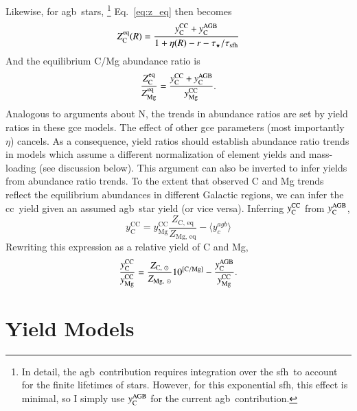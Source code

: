 \documentclass[12pt,oneside,letterpaper]{report}
\newcommand{\cc}{\gls{cc}}
\newcommand{\agb}{\gls{agb}}
\newcommand{\sfh}{\gls{sfh}}
\newcommand{\gce}{\gls{gce}}
\newcommand{\Ycc}{\ensuremath{y_{\rm C}^{\rm CC}}}
\newcommand{\Yoc}{\ensuremath{y_{\rm Mg}^{\rm CC}}}
\newcommand{\Ycagb}{\ensuremath{y_{\rm C}^{\rm AGB}}}
\begin{document}
Likewise, for \agb\ stars,%
\footnote{In detail, the \agb\ contribution requires integration over the \sfh\ to account for the finite lifetimes of stars. However, for this exponential \sfh, this effect is minimal, so I simply use $\Ycagb$ for the current \agb\ contribution.}
Eq.~\ref{eq:z_eq} then becomes
\begin{equation}
    Z_{\rm C}^{\rm eq}(R) = \frac{\Ycc + \Ycagb}{1 + \eta(R) - r - \tau_\star / \tau_{\rm sfh}}
\end{equation}
And the equilibrium C/Mg abundance ratio is
\begin{equation}\label{eq:z_co}
    \frac{Z_{\rm C}^{\rm eq}}{Z_{\rm Mg}^{\rm eq}} = \frac{\Ycc + \Ycagb }{\Yoc}.
\end{equation}
Analogous to \cite{james+23} arguments about N, the trends in abundance ratios are set by yield ratios in these \gce{} models. The effect of other \gce{} parameters (most importantly $\eta$) cancels. As a consequence, yield ratios should establish abundance ratio trends in models which assume a different normalization of element yields and mass-loading (see discussion below).
This argument can also be inverted to infer  yields from abundance ratio trends. To the extent that observed C and Mg trends reflect the equilibrium abundances in different Galactic regions, we can infer the \cc\ yield given an assumed \agb\ star yield (or vice versa). Inferring $\Ycc$ from $\Ycagb$, 
\begin{equation}
    y_\text{C}^\text{CC} =  y_\text{Mg}^\text{CC} \frac{Z_\text{C,~eq}}{Z_\text{Mg,~eq}} - \langle y_c^{agb} \rangle
\end{equation}
Rewriting this expression as a relative yield of C and Mg,
\begin{equation}\label{eq:y_c_eq}
    \frac{\Ycc}{\Yoc} = \frac{Z_{\text{C},~\odot}}{Z_{\text{Mg},~\odot}} 10^{\rm [C/Mg]} - \frac{\Ycagb}{\Yoc}.
\end{equation}

\section{Yield Models}
\end{document}
